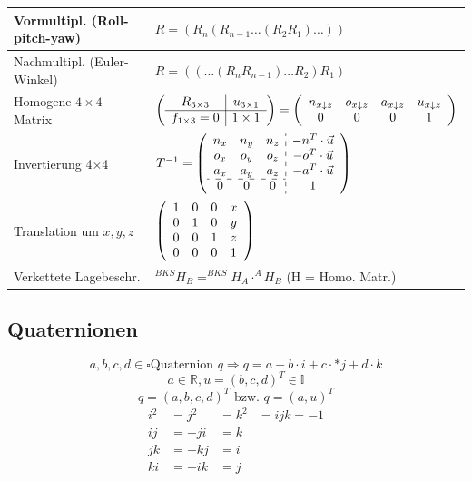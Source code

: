 \documentclass[8pt,a4paper,landscape]{scrartcl}
\begin{document}
\begin{multicols*}{3}
\begin{tabularx}{\columnwidth}{X|m{}}
Vormultipl. (Roll-pitch-yaw) & $ R = (R_n(R_{n-1}\ldots(R_2R_1)\ldots)) $\\ \hline
Nachmultipl. (Euler-Winkel) & $ R = ((\ldots (R_nR_{n-1})\ldots R_2)R_1) $\\ \hline
Homogene $4\times4$-Matrix & $\left(\begin{Array}{c|c}
	R_{3\times3} & u_{3\times1}\\ \hline
	f_{1\times3} = 0 & 1\times1
\end{Array}\right) = \left(\begin{Array}{cccc}
n_{x\downarrow z} & o_{x\downarrow z} & a_{x\downarrow z} & u_{x\downarrow z}\\
0 & 0& 0 & 1
\end{Array}\right)$\\ \hline
Invertierung 4$\times$4 &  $T^{-1} = \left(\begin{Array}{ccc:c}
	n_{x} & n_{y} & n_{z} & -n^{T}\cdot\vec{u}\\
	o_{x} & o_{y} & o_{z} & -o^{T}\cdot\vec{u}\\
	a_{x} & a_{y} & a_{z} & -a^{T}\cdot\vec{u}\\ \cdashline{1-3}
	0 & 0&0&1
\end{Array}\right)$\\ \hline
Translation um $ x,y,z $ & $ \left(\begin{Array}{cccc}
	1 & 0 & 0 & x\\
	0 & 1 & 0 & y\\
	0 & 0 & 1 & z\\
	0 & 0 & 0 & 1
\end{Array}\right) $\\ \hline
Verkettete Lagebeschr.& $ ^{BKS}H_{B}  = ^{BKS}H_{A} \cdot ^{A}H_{B}$ \hfill (H = Homo. Matr.)\\ 
\end{tabularx}

\subsection*{Quaternionen}
$$a,b,c,d \in \square \text{Quaternion } q \Rightarrow q = a + b\cdot i + c \cdot * j + d \cdot k $$
$$a \in \mathbb{R}, u = (b,c,d)^T \in \mathbb{I}$$
$$q = (a,b,c,d)^T \text{ bzw. } q=(a,u)^T$$
\begin{alignat*}{3}
	i^2 &= j^2 &= k^2 &= ijk = -1\\
	ij &= -ji &= k\\
	jk &= -kj &= i\\
	ki &= -ik &= j
\end{alignat*}


\end{multicols*}
\end{document}

